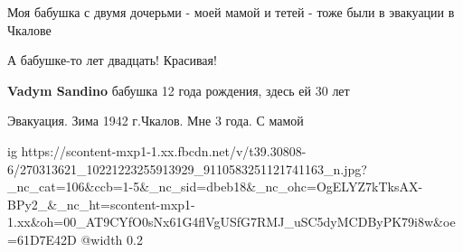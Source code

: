  
 
 
 
 

Моя бабушка с двумя дочерьми - моей мамой и тетей - тоже были в эвакуации в Чкалове

А бабушке-то лет двадцать! Красивая!

\textbf{Vadym Sandino} бабушка 12 года рождения, здесь ей 30 лет

Эвакуация. Зима 1942 г.Чкалов. Мне 3 года. С мамой

\ifcmt
  ig https://scontent-mxp1-1.xx.fbcdn.net/v/t39.30808-6/270313621_10221223255913929_9110583251121741163_n.jpg?_nc_cat=106&ccb=1-5&_nc_sid=dbeb18&_nc_ohc=OgELYZ7kTksAX-BPy2_&_nc_ht=scontent-mxp1-1.xx&oh=00_AT9CYfO0sNx61G4flVgUSfG7RMJ_uSC5dyMCDByPK79i8w&oe=61D7E42D
  @width 0.2
\fi
